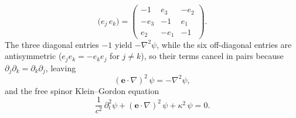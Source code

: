 \documentclass[aps,prd,onecolumn,tightenlines,nofootinbib,notitlepage,11pt,floatfix]{revtex4-2}
\theoremstyle{indentedtheorem}
\begin{document}
\begin{equation}
    \big(e_j \, e_k\big) = \begin{pmatrix} -1 & e_3 & -e_2 \\ -e_3 & -1 & e_1 \\ e_2 & -e_1 & -1 \end{pmatrix} .
    \label{eq:unit_table}
\end{equation}
The three diagonal entries $-1$ yield $-\nabla^2\psi$, while the six off-diagonal entries are antisymmetric ($e_j e_k = -e_k e_j$ for $j\neq k$), so their terms cancel in pairs because $\partial_j\partial_k = \partial_k\partial_j$, leaving
\begin{equation}
    (\mathbf{e}\cdot\nabla)^2\,\psi = -\nabla^2\psi ,
    \label{eq:gradient_square}
\end{equation}
and the free spinor Klein--Gordon equation
\begin{equation}
    \frac{1}{c^2}\,\partial_t^2\psi + (\mathbf{e}\cdot\nabla)^2\,\psi + \kappa^2\,\psi = 0 .
    \label{eq:klein_gordon_spinor}
\end{equation}
\end{document}
